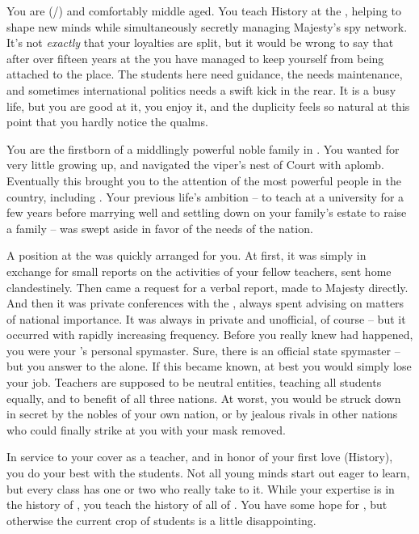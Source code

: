 \documentclass[char]{GL2020}
\begin{document}
\name{\cHistory{}}


You are \cHistory{} (\cHistory{\they}/\cHistory{\them}) and comfortably middle aged. You teach History at the \pSchool{}, helping to shape new minds while simultaneously secretly managing \cQueen{\Their} Majesty’s spy network. It’s not \emph{exactly} that your loyalties are split, but it would be wrong to say that after over fifteen years at the \pSchool{} you have managed to keep yourself from being attached to the place. The students here need guidance, the \pSc{} needs maintenance, and sometimes international politics needs a swift kick in the rear. It is a busy life, but you are good at it, you enjoy it, and the duplicity feels so natural at this point that you hardly notice the qualms.

You are the firstborn \cHistory{\child} of a middlingly powerful noble family in \pFarm{}. You wanted for very little growing up, and navigated the viper’s nest of Court with aplomb. Eventually this brought you to the attention of the most powerful people in the country, including \cQueen{\Majesty} \cQueen{} \cQueen{\themself}. Your previous life’s ambition -- to teach at a \pFarm{} university for a few years before marrying well and settling down on your family’s estate to raise a family -- was swept aside in favor of the needs of the nation.

A position at the \pSchool{} was quickly arranged for you. At first, it was simply in exchange for small reports on the activities of your fellow teachers, sent home clandestinely. Then came a request for a verbal report, made to \cQueen{\Their} Majesty directly. And then it was private conferences with the \cQueen{\Majesty}, always spent advising \cQueen{\them} on matters of national importance. It was always in private and unofficial, of course -- but it occurred with rapidly increasing frequency. Before you really knew had happened, you were your \cQueen{\Majesty}’s personal spymaster. Sure, there is an official state spymaster -- but you answer to the \cQueen{\Majesty} alone. If this became known, at best you would simply lose your job. Teachers are supposed to be neutral entities, teaching all students equally, and to benefit of all three nations. At worst, you would be struck down in secret by the nobles of your own nation, or by jealous rivals in other nations who could finally strike at you with your mask removed.

In service to your cover as a teacher, and in honor of your first love (History), you do your best with the students. Not all young minds start out eager to learn, but every class has one or two who really take to it. While your expertise is in the history of \pFarm{}, you teach the history of all of \pEarth{}. You have some hope for \cLibAssist{}, but otherwise the current crop of students is a little disappointing.
\end{document}
